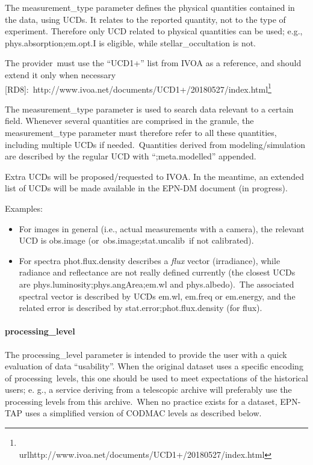 \documentclass[11pt,a4paper]{ivoa}
\begin{document}
The measurement\_type parameter defines the physical quantities contained in the data, using UCDs. It relates to the reported quantity, not to the type of experiment. Therefore only UCD related to physical quantities can be used; e.g., phys.absorption;em.opt.I is eligible, while stellar\_occultation is not.

The provider must use the ``UCD1+'' list from IVOA as a reference, and should extend it only when necessary [RD8]: http://www.ivoa.net/documents/UCD1+/20180527/index.html\footnote{\\url{http://www.ivoa.net/documents/UCD1+/20180527/index.html}}

The measurement\_type parameter is used to search data relevant to a certain field. Whenever several quantities are comprised in the granule, the measurement\_type parameter must therefore refer to all these quantities, including multiple UCDs if needed. Quantities derived from modeling/simulation are described by the regular UCD with ``;meta.modelled'' appended. 

Extra UCDs will be proposed/requested to IVOA. In the meantime, an extended list of UCDs will be made available in the EPN-DM document (in progress).

Examples:

\begin{itemize}
\item For images in general (i.e., actual measurements with a camera), the relevant UCD is obs.image (or obs.image;stat.uncalib if not calibrated).
\item For spectra phot.flux.density describes a \emph{flux} vector (irradiance), while radiance and reflectance are not really defined currently (the closest UCDs are phys.luminosity;phys.angArea;em.wl and phys.albedo). The associated spectral vector is described by UCDs em.wl, em.freq or em.energy, and the related error is described by stat.error;phot.flux.density (for flux).
\end{itemize}

\paragraph{processing\_level}

The processing\_level parameter is intended to provide the user with a quick evaluation of data ``usability''. When the original dataset uses a specific encoding of processing levels, this one should be used to meet expectations of the historical users; e. g., a service deriving from a telescopic archive will preferably use the processing levels from this archive. When no practice exists for a dataset, EPN-TAP uses a simplified version of CODMAC levels as described below.
\end{document}
